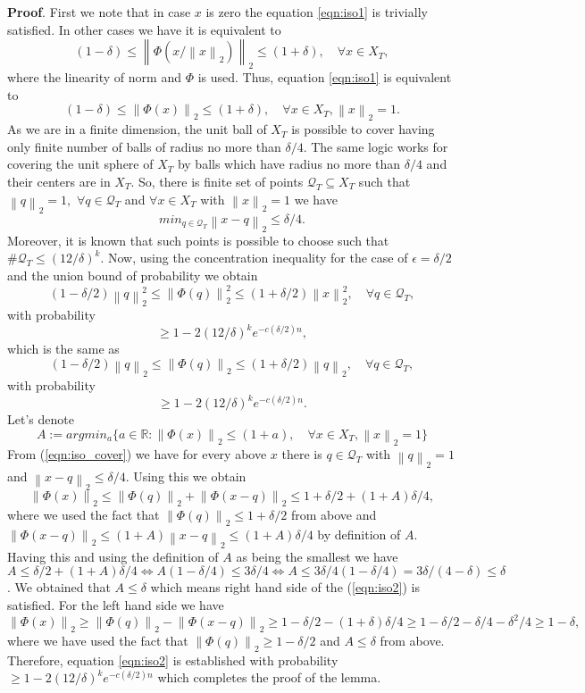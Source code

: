 \documentclass[twoside,11pt]{article}
\newcommand\norm[1]{\left\lVert#1\right\rVert}
\begin{document}
\noindent
{\bf Proof}. First we note that in case $x$ is zero the equation \ref{eqn:iso1} is trivially satisfied. In other cases we have it is equivalent to 
$$
(1 - \delta) \leq \norm{\Phi(x/\norm{x}_2)}_2 \leq (1 + \delta) , \quad \forall x \in X_T,
$$
where the linearity of norm and $\Phi$ is used. Thus, equation \ref{eqn:iso1} is equivalent to 
\begin{equation}
\label{eqn:iso2}
(1 - \delta) \leq \norm{\Phi(x)}_2 \leq (1 + \delta) , \quad \forall x \in X_T, \norm{x}_2 = 1.
\end{equation}
As we are in a finite dimension, the unit ball of $X_T$ is possible to cover having only finite number of balls of radius no more than $\delta/4$. The same logic works for covering the unit sphere of $X_T$ by balls which have radius no more than $\delta/4$ and their centers are in $X_T$. So, there is finite set of points $\mathcal{Q}_T \subseteq X_T$ such that $\norm{q}_2 = 1,$ $\forall q \in \mathcal{Q}_T$ and $\forall x \in X_T$ with $\norm{x}_2 = 1$ we have 
\begin{equation}
\label{eqn:iso_cover}
    min_{q \in \mathcal{Q}_T} \norm{x-q}_2 \leq \delta/4.
\end{equation}
Moreover, it is known that such points is possible to choose such that $\# \mathcal{Q}_T \leq (12/\delta)^k$. Now, using the concentration inequality for the case of $\epsilon = \delta/2$ and the union bound of probability we obtain
$$
(1 - \delta/2) \norm{q}_2^2 \leq \norm{\Phi(q)}_2^2 \leq (1 + \delta/2) \norm{x}_2^2, \quad \forall q \in \mathcal{Q}_T,
$$
with probability
$$
   \geq 1 - 2(12/\delta)^k e^{-c(\delta/2)n},
$$
which is the same as
$$
(1 - \delta/2) \norm{q}_2 \leq \norm{\Phi(q)}_2 \leq (1 + \delta/2) \norm{q}_2, \quad \forall q \in \mathcal{Q}_T,
$$
with probability
$$
   \geq 1 - 2(12/\delta)^k e^{-c(\delta/2)n}.
$$ 
Let's denote 
$$
    A := 
    argmin_{a} \{a \in \mathbb{R} : \norm{\Phi(x)}_2 \leq (1 + a), \quad \forall x \in X_T, \norm{x}_2 = 1 \}
$$
From (\ref{eqn:iso_cover}) we have for every above $x$ there is $q \in \mathcal{Q}_T$ with $\norm{q}_2 = 1$ and $\norm{x-q}_2 \leq \delta/4$. Using this we obtain
$$
\norm{\Phi(x)}_2 \leq \norm{\Phi(q)}_2 + \norm{\Phi(x - q)}_2 \leq 1 + \delta/2 + (1 + A)\delta/4,
$$
where we used the fact that $\norm{\Phi(q)}_2 \leq 1 + \delta/2$ from above and $\norm{\Phi(x - q)}_2 \leq (1 + A)\norm{x-q}_2 \leq (1 + A)\delta/4$ by definition of $A$. Having this and using the definition of $A$ as being the smallest we have $A \leq \delta/2 + (1 + A)\delta/4 \iff A(1 - \delta/4) \leq 3\delta/4 \iff A \leq 3\delta/{4(1-\delta/4)} = 3\delta/{(4-\delta)} \leq \delta$. We obtained that $A \leq \delta$ which means right hand side of the (\ref{eqn:iso2}) is satisfied. For the left hand side we have 
$$
\norm{\Phi(x)}_2 \geq \norm{\Phi(q)}_2 - \norm{\Phi(x - q)}_2 \geq 1 - \delta/2 - (1 + \delta)\delta/4 \geq 1 - \delta/2 - \delta/4 -\delta^2/4 \geq 1 - \delta,
$$
where we have used the fact that $\norm{\Phi(q)}_2 \geq 1 - \delta/2$ and $A \leq \delta$ from above. Therefore, equation \ref{eqn:iso2} is established with probability $\geq 1 - 2(12/\delta)^k e^{-c(\delta/2)n} $ which completes the proof of the lemma.
\end{document}

